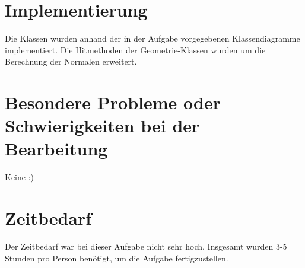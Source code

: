 \documentclass[a4paper,parskip=half,11pt]{scrartcl}
\begin{document}
\section*{Implementierung}

Die Klassen wurden anhand der in der Aufgabe vorgegebenen Klassendiagramme implementiert.
Die Hitmethoden der Geometrie-Klassen wurden um die Berechnung der Normalen erweitert.

\section*{Besondere Probleme oder Schwierigkeiten bei der Bearbeitung}
Keine :)

\section*{Zeitbedarf}
Der Zeitbedarf war bei dieser Aufgabe nicht sehr hoch. Insgesamt wurden 3-5 Stunden pro Person benötigt, um die Aufgabe fertigzustellen.
\end{document}
